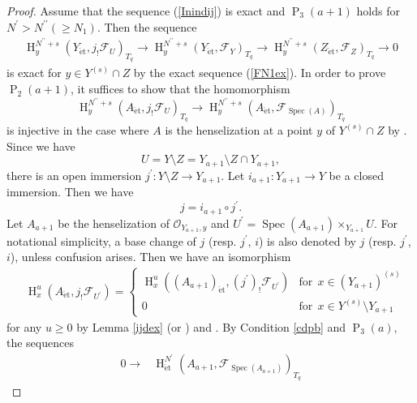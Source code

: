 \documentclass{article}
\newcommand{\spec}{\operatorname{Spec}}
\newcommand{\et}{\mathrm{\acute{e}t}}
\newcommand{\HO}{\operatorname{H}}
\begin{document}
\begin{proof}
Assume that the sequence (\ref{Inindij}) is exact 
and $\operatorname{P}_{3}(a+1)$ holds
for $N^{\prime}> N^{\prime\prime} ( \geq N_{1})$. 
Then the sequence
%
\begin{align*}
\HO^{N^{\prime\prime}+s}_{y}(
Y_{\et},
j_{!}\mathcal{F}_{U}
)_{T_{q}}    
\to 
\HO^{N^{\prime\prime}+s}_{y}(
Y_{\et},
\mathcal{F}_{Y}
)_{T_{q}} 
\to 
\HO^{N^{\prime\prime}+s}_{y}(
Z_{\et},
\mathcal{F}_{Z}
)_{T_{q}} 
\to 0
\end{align*}
%
is exact for $y\in Y^{(s)}\cap Z$
by the exact sequence (\ref{FN1ex}).
In order to prove $\operatorname{P}_{2}(a+1)$,
it suffices to show that the homomorphism
%
\begin{equation}\label{injsupj2}
\HO^{N^{\prime\prime}+s}_{y}(
A_{\et},
j_{!}\mathcal{F}_{U}
)_{T_{q}}    
\to
\HO^{N^{\prime\prime}+s}_{y}(
A_{\et},
\mathcal{F}_{\spec(A)}
)_{T_{q}}
\end{equation}
%
is injective in the case where $A$ is the henselization at a point
$y$ of $Y^{(s)}\cap Z$ by \cite[p.93, III, Corollary 1.28]{M}.
Since we have
%
\begin{equation*}
U=
Y\setminus Z
=
Y_{a+1}\setminus
Z\cap Y_{a+1},
\end{equation*}
%
there is an open immersion 
$j^{\prime}: Y\setminus Z\to Y_{a+1}$. 
Let $i_{a+1}: Y_{a+1}\to Y$ 
be a closed immersion.
Then we have
%
\begin{equation*}
j=i_{a+1}\circ j^{\prime}.    
\end{equation*}
%
Let $A_{a+1}$ be the henselization of $\mathcal{O}_{Y_{a+1}, y}$
and 
$U^{\prime}=\spec(A_{a+1})\times_{Y_{a+1}}U$. 
For notational simplicity, 
a base change of $j$ (resp. $j^{\prime}$, $i$)
is also denoted by
$j$ (resp. $j^{\prime}$, $i$),
unless confusion arises.
Then we have an isomorphism
%
\begin{align}\label{eqj12}
&
\HO_{x}^{u}(
A_{\et},
j_{!}\mathcal{F}_{U^{\prime}}
)
=
\left\{
%
\begin{array}{ll}
\HO^{u}_{x}((A_{a+1})_{\et}, (j^{\prime})_{!}\mathcal{F}_{U^{\prime}})
& \textrm{for}~~x\in (Y_{a+1})^{(s)} \\ [5pt]
0
& \textrm{for}~~x\in Y^{(s)}\setminus Y_{a+1}
\end{array}
%
\right.
\end{align}
%
for any $u\geq 0$
by Lemma \ref{ijdex} (or \cite[p.169, V, Proposition 1.13]{M}) and \cite[Lemma 3.7]{Sak5}. 
By Condition \ref{cdpb} and 
$\operatorname{P}_{3}(a)$,
the sequences
%
\begin{align*}
0\to 
&\HO_{\et}^{N^{\prime}}(A_{a+1}, \mathcal{F}_{\spec(A_{a+1})})_{T_{q}}

\end{align*}
\end{proof}
\end{document}
